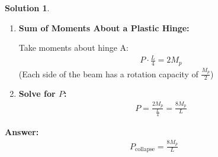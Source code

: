 \documentclass[12pt]{article}
\theoremstyle{definition} %
\newtheorem{solution}{Solution}
\theoremstyle{plain} %
\begin{document}
\begin{solution}
\begin{enumerate}
    \item \textbf{Sum of Moments About a Plastic Hinge:}
    
    Take moments about hinge A:
    \begin{align}
    P \cdot \frac{L}{4} = 2 M_p
    \end{align}
    (Each side of the beam has a rotation capacity of $ \frac{M_p}{2} $)
    
    \item \textbf{Solve for $ P $:}
    \begin{align}
    P = \frac{2 M_p}{\frac{L}{4}} = \frac{8 M_p}{L}
    \end{align}
    
\end{enumerate}


\noindent\textbf{Answer:}
\begin{align}
\boxed{P_{\text{collapse}} = \frac{8 M_p}{L}}
\end{align}



\end{solution}
\end{document}
